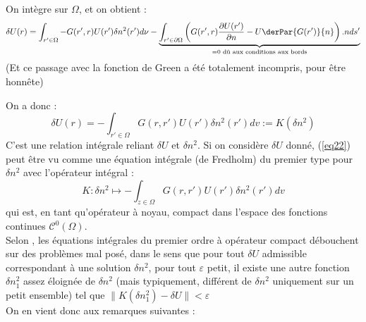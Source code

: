 \documentclass{article}
\begin{document}
On intègre sur $\Omega$, et on obtient :
\[\delta U(r)=\int_{r'\in\Omega} -G(r',r)U(r')\delta n^2(r')d\nu - \underbrace{\int_{r'\in\partial\Omega} \left( G(r',r)\frac{\partial U(r')}{\partial n} -U\derPar{G(r')}{n}\right).n ds'}_{=0 \text{ dû aux conditions aux bords}}\]
(Et ce passage avec la fonction de Green a été totalement incompris, pour être honnête)

\bigskip
On a donc :
\begin{equation}\label{eq22}
	\delta U(r)=-\int_{r'\in\Omega} G(r,r')U(r')\delta n^2(r')dv := K(\delta n^2)
\end{equation}
C'est une relation intégrale reliant $\delta U$ et $\delta n^2$. Si on considère $\delta U$ donné, (\ref{eq22}) peut être vu comme une équation intégrale (de Fredholm) du premier type pour $\delta n^2$ avec l'opérateur intégral :
\[K : \delta n^2 \mapsto -\int_{z\in\Omega} G(r,r')U(r')\delta n^2(r') dv\]
qui est, en tant qu'opérateur à noyau, compact dans l'espace des fonctions continues $\mathscr{C}^0(\Omega)$. \\
Selon \cite{engl96regu}, les équations intégrales du premier ordre à opérateur compact débouchent sur des problèmes mal posé, dans le sens que pour tout $\delta U$ admissible correspondant à une solution $\delta n^2$, pour tout $\varepsilon$ petit, il existe une autre fonction $\delta n_1^2$ assez éloignée de $\delta n^2$ (mais typiquement, différent de $\delta n^2$ uniquement sur un petit ensemble) tel que $\|K(\delta n_1^2)-\delta U\|<\varepsilon$\\
On en vient donc aux remarques suivantes :
\end{document}
